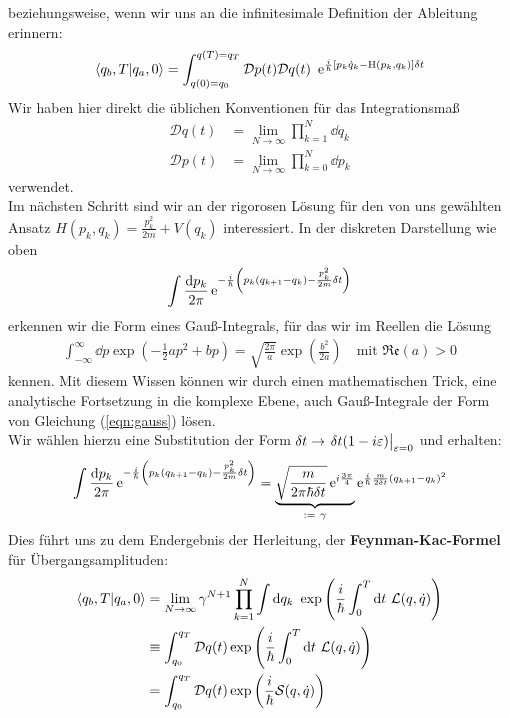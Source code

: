 beziehungsweise, wenn wir uns an die infinitesimale Definition der Ableitung erinnern:
\begin{align}
	\braket{q_b,T}{q_a,0} = \int_{q(0)=q_0}^{q(T)=q_T} \mathcal{D}p(t)\mathcal{D}q(t) \ \operatorname{e}^{\ihbar\left[p_k\dot{q}_k - \operatorname{H}(p_k,q_k)\right]\delta t}
\end{align}
Wir haben hier direkt die üblichen Konventionen für das Integrationsmaß
\begin{align*}
	\mathcal{D}q(t) &= \lim_{N\rightarrow\infty} \prod_{k=1}^{N} \dd q_k \\
	\mathcal{D}p(t) &= \lim_{N\rightarrow\infty} \prod_{k=0}^{N} \dd p_k
\end{align*}
verwendet. \\ 
Im nächsten Schritt sind wir an der rigorosen Lösung für den von uns gewählten Ansatz $H(p_k,q_k) = \frac{p_k^2}{2m} + V(q_k)$ interessiert. In der diskreten Darstellung wie oben
\begin{align}
	\int\frac{\dd p_k}{2\pi} \operatorname{e}^{-\frac{i}{\hbar}\left(p_k(q_{k+1}-q_k)-\frac{p_k^2}{2m}\delta t\right)} \label{eqn:gauss}
\end{align}
erkennen wir die Form eines Gauß-Integrals, für das wir im Reellen die Lösung 
\begin{align}
	\int_{-\infty}^{\infty}\dd p \exp\left(-\frac{1}{2}a p^2 + b p\right) = \sqrt{\frac{2\pi}{a}}\exp\left(\frac{b^2}{2a}\right) \quad \text{mit } \mathfrak{Re}(a)>0 
\end{align}
kennen. Mit diesem Wissen können wir durch einen mathematischen Trick, eine analytische Fortsetzung in die komplexe Ebene, auch Gauß-Integrale der Form von Gleichung (\ref{eqn:gauss}) lösen. \\
 Wir wählen hierzu eine Substitution der Form $\delta t \rightarrow \eval{\delta t(1- i\varepsilon)}_{\varepsilon=0}$ und erhalten:
 \begin{align}
 	\int\frac{\dd p_k}{2\pi} \operatorname{e}^{-\frac{i}{\hbar}\left(p_k(q_{k+1}-q_k)-\frac{p_k^2}{2m}\delta t\right)} = \underbrace{\sqrt{\frac{m}{2\pi\hbar\delta t}}\operatorname{e}^{i\frac{3\pi}{4}}}_{:= \ \gamma} \operatorname{e}^{\frac{i}{\hbar}\frac{m}{2\delta t}(q_{k+1}-q_k)^2}
 \end{align}
 Dies führt uns zu dem Endergebnis der Herleitung, der \textbf{Feynman-Kac-Formel} für Übergangsamplituden: 
 \begin{align}
 		 \braket{q_b,T}{q_a,0} &= \lim_{N \rightarrow\infty} \gamma^{N+1}\prod_{k=1}^{N} \int\dd q_k \ \exp\left(\ihbar\int_{0}^{T}\dd t \ \mathcal{L}(q,\dot{q})\right) \nonumber \\
	 &\equiv \int_{q_0}^{q_T} \mathcal{D}q(t) \exp\left(\ihbar\int_{0}^{T}\dd t \ \mathcal{L}(q,\dot{q})\right) \nonumber \\
	 &= \int_{q_0}^{q_T} \mathcal{D}q(t) \exp\left(\ihbar \mathcal{S}(q,\dot{q})\right) \label{eqn:feynman-kac}
 \end{align}
